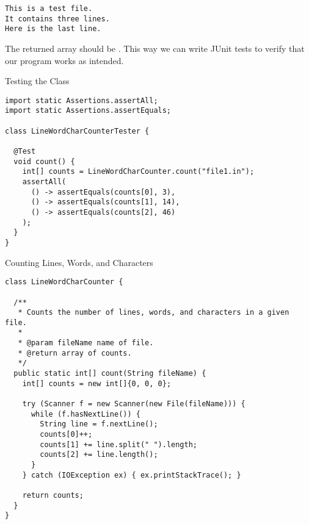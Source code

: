 
\par{
\begin{verbatim}
This is a test file.
It contains three lines.
Here is the last line.
\end{verbatim}
}
The returned array should be \ttt{[3, 14, 46]}. This way we can write JUnit tests to verify that our program works as intended.

\begin{cl}{Testing the  Class}
\begin{lstlisting}[language=MyJava]
import static Assertions.assertAll;
import static Assertions.assertEquals;

class LineWordCharCounterTester {

  @Test
  void count() {
    int[] counts = LineWordCharCounter.count("file1.in");
    assertAll(
      () -> assertEquals(counts[0], 3),
      () -> assertEquals(counts[1], 14),
      () -> assertEquals(counts[2], 46)
    );
  }
}
\end{lstlisting}
\end{cl}

\begin{cl}{Counting Lines, Words, and Characters}
\begin{lstlisting}[language=MyJava]
class LineWordCharCounter {

  /**
   * Counts the number of lines, words, and characters in a given file.
   *
   * @param fileName name of file.
   * @return array of counts.
   */
  public static int[] count(String fileName) {
    int[] counts = new int[]{0, 0, 0};

    try (Scanner f = new Scanner(new File(fileName))) {
      while (f.hasNextLine()) {
        String line = f.nextLine();
        counts[0]++;
        counts[1] += line.split(" ").length;
        counts[2] += line.length();
      }
    } catch (IOException ex) { ex.printStackTrace(); }

    return counts;
  }
}
\end{lstlisting}
\end{cl}

